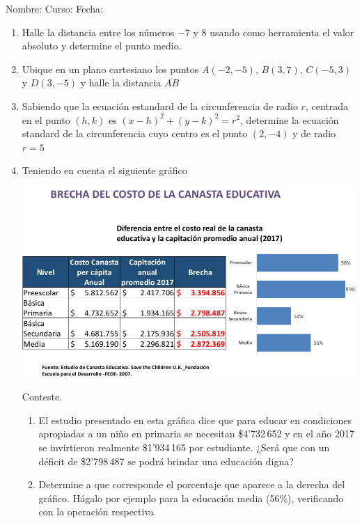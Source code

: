 \documentclass[fleqn]{article}
\newcommand{\LineaNombre}{%
\par
\vspace{\baselineskip}
Nombre:\hrulefill \; Curso: \underline{\hspace*{48pt}} \; Fecha: \underline{\hspace*{2.5cm}} \relax
\par}
\begin{document}
\LineaNombre
\begin{enumerate}
 \item Halle la distancia entre los números $-7$ y 8 usando como herramienta el valor absoluto y determine el punto medio.\noanswer
 \item Ubique en un plano cartesiano los puntos $A(-2,-5)$, $B(3,7)$, $C(-5,3)$ y $D(3,-5)$ y halle la distancia $\overline{AB}$
  \item Sabiendo que la ecuación estandard de la circunferencia de radio $r$, centrada en el punto $(h,k)$ es $(x-h)^{2}+(y-k)^{2}=r^{2}$, determine la ecuación standard de la circunferencia cuyo centro es el punto $(2,-4)$ y de radio $r=5$ \noanswer
 \item Teniendo en cuenta el siguiente gráfico
 \begin{center}
 \includegraphics[scale=.375]{Images/BrechaCanasta.png} 
 \end{center}
 Conteste.
 \begin{enumerate}
 \item El estudio presentado en esta gráfica dice que para educar en condiciones apropiadas a un niño en primaria se necesitan \$4'732\,652 y en el año 2017 se invirtieron realmente \$1'934\,165 por estudiante. ¿Será que con un déficit de \$2'798\,487 se podrá brindar una educación digna?
 \item Determine a que corresponde el porcentaje que aparece a la derecha del gráfico. Hágalo por ejemplo para la educación media (56\%), verificando con la operación respectiva \noanswer

\end{enumerate}
\end{enumerate}
\end{document}
